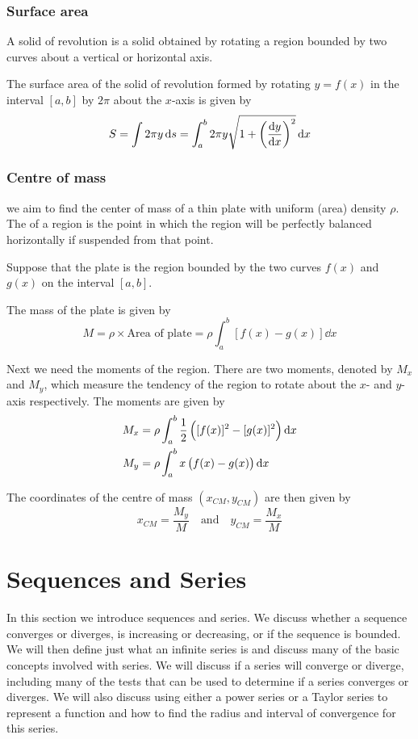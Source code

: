 \subsubsection{Surface area}
A solid of revolution is a solid obtained by rotating a region bounded by two curves about a vertical or horizontal axis.

The surface area of the solid of revolution formed by rotating $y=f(x)$ in the interval $[a,b]$ by $2\pi$ about the $x$-axis is given by
\begin{equation}
S = \int2\pi y\dd{s} = \int_a^b 2\pi y \sqrt{1+\left(\dv{y}{x}\right)^2} \dd{x}
\end{equation}

\subsubsection{Centre of mass}
we aim to find the center of mass of a thin plate with uniform (area) density $\rho$. The  of a region is the point in which the region will be perfectly balanced horizontally if suspended from that point.

Suppose that the plate is the region bounded by the two curves $f(x)$ and $g(x)$ on the interval $[a,b]$.

The mass of the plate is given by
\[ M = \rho \times \text{Area of plate} = \rho \int_a^b[f(x)-g(x)]\dd{x} \]

Next we need the moments of the region. There are two moments, denoted by $M_x$ and $M_y$, which measure the tendency of the region to rotate about the $x$- and $y$-axis respectively. The moments are given by
\begin{align*}
M_x & = \rho \int_a^b \frac{1}{2}\left([f(x)]^2-[g(x)]^2\right)\dd{x} \\
M_y & = \rho \int_a^b x\left(f(x)-g(x)\right)\dd{x}
\end{align*}

The coordinates of the centre of mass $(x_{CM},y_{CM})$ are then given by
\[ x_{CM} = \frac{M_y}{M} \quad \text{and} \quad y_{CM} = \frac{M_x}{M} \]

\pagebreak

\section{Sequences and Series}
In this section we introduce sequences and series. We discuss whether a sequence converges or diverges, is increasing or decreasing, or if the sequence is bounded. We will then define just what an infinite series is and discuss many of the basic concepts involved with series. We will discuss if a series will converge or diverge, including many of the tests that can be used to determine if a series converges or diverges. We will also discuss using either a power series or a Taylor series to represent a function and how to find the radius and interval of convergence for this series.

